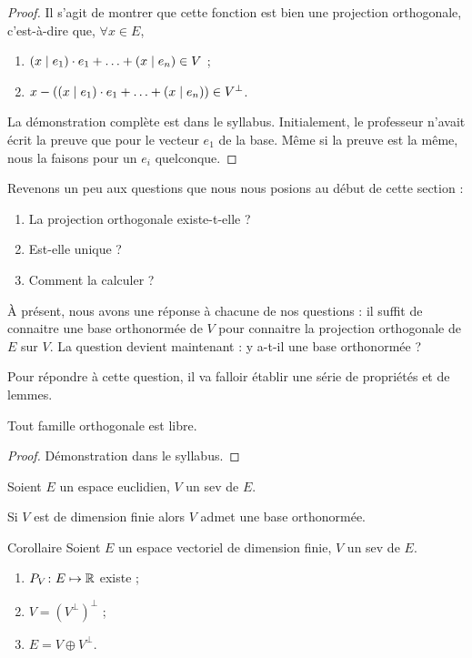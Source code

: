 \begin{proof}
Il s'agit de montrer que cette fonction est bien une projection orthogonale, c'est-à-dire que, $\forall x \in E$,
\begin{enumerate}
\item $\left( x \mid e_1 \right) \cdot e_1 + \ldots + \left( x \mid e_n \right) \in V$ ;
\item $x - \left( \left( x \mid e_1 \right) \cdot e_1 + \ldots + \left( x \mid e_n \right) \right) \in V^\perp$.
\end{enumerate}

La démonstration complète est dans le syllabus. Initialement, le professeur n'avait écrit la preuve que pour le vecteur $e_1$ de la base. Même si la preuve est la même, nous la faisons pour un $e_i$ quelconque.
\end{proof}

Revenons un peu aux questions que nous nous posions au début de cette section :
\begin{enumerate}
\item La projection orthogonale existe-t-elle ?
\item Est-elle unique ?
\item Comment la calculer ?
\end{enumerate}

À présent, nous avons une réponse à chacune de nos questions : il suffit de connaitre une base orthonormée de $V$ pour connaitre la projection orthogonale de $E$ sur $V$. La question devient maintenant : y a-t-il une base orthonormée ?

Pour répondre à cette question, il va falloir établir une série de propriétés et de lemmes.

\begin{lemme}
Tout famille orthogonale est libre.
\end{lemme}
\begin{proof}
Démonstration dans le syllabus.
\end{proof}
\begin{propriete}
Soient $E$ un espace euclidien, $V$ un sev de $E$.

Si $V$ est de dimension finie alors $V$ admet une base orthonormée.
\end{propriete}
\begin{propriete}{Corollaire}
Soient $E$ un espace vectoriel de dimension finie, $V$ un sev de $E$.
\begin{enumerate}
\item $P_V \colon E \mapsto \mathbb{R}$ existe ;
\item $V = \left( V^\perp \right)^\perp$ ;
\item $E = V \oplus V^\perp$.
\end{enumerate}
\end{propriete}

